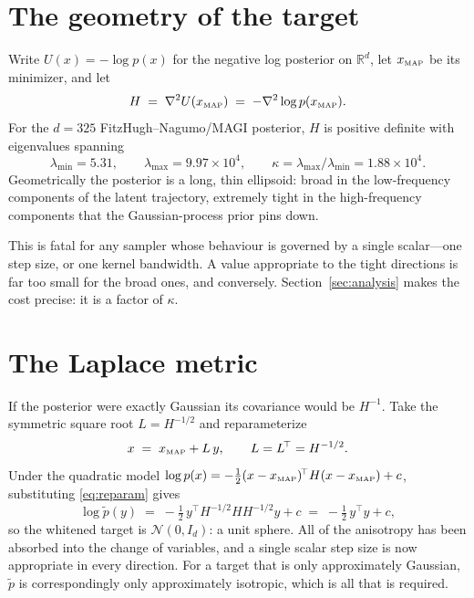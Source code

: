 \documentclass[11pt]{article}
\newcommand{\R}{\mathbb{R}}
\newcommand{\xmap}{x_{\text{\tiny MAP}}}
\begin{document}
\section{The geometry of the target}

Write $U(x) = -\log p(x)$ for the negative log posterior on $\R^d$, let $\xmap$ be its minimizer,
and let
\begin{equation}
  H \;=\; \nabla^2 U(\xmap) \;=\; -\nabla^2 \log p(\xmap).
\end{equation}
For the $d=325$ FitzHugh--Nagumo/MAGI posterior, $H$ is positive definite with eigenvalues
spanning
\[
  \lambda_{\min} = 5.31, \qquad \lambda_{\max} = 9.97\times10^{4},
  \qquad \kappa = \lambda_{\max}/\lambda_{\min} = 1.88\times 10^{4}.
\]
Geometrically the posterior is a long, thin ellipsoid: broad in the low-frequency components of
the latent trajectory, extremely tight in the high-frequency components that the Gaussian-process
prior pins down.

This is fatal for any sampler whose behaviour is governed by a single scalar---one step size, or
one kernel bandwidth. A value appropriate to the tight directions is far too small for the broad
ones, and conversely. Section~\ref{sec:analysis} makes the cost precise: it is a factor of
$\kappa$.

\section{The Laplace metric}

If the posterior were exactly Gaussian its covariance would be $H^{-1}$. Take the symmetric
square root $L = H^{-1/2}$ and reparameterize
\begin{equation}
  x \;=\; \xmap + L\,y, \qquad L = L^{\!\top} = H^{-1/2}.
  \label{eq:reparam}
\end{equation}
Under the quadratic model $\log p(x) = -\tfrac12 (x-\xmap)^{\!\top} H (x-\xmap) + c$, substituting
\eqref{eq:reparam} gives
\begin{equation}
  \log \tilde p(y) \;=\; -\tfrac12\, y^{\!\top} H^{-1/2} H H^{-1/2} y + c
  \;=\; -\tfrac12\, y^{\!\top} y + c,
\end{equation}
so the whitened target is $\mathcal{N}(0, I_d)$: a unit sphere. All of the anisotropy has been
absorbed into the change of variables, and a single scalar step size is now appropriate in every
direction. For a target that is only approximately Gaussian, $\tilde p$ is correspondingly only
approximately isotropic, which is all that is required.
\end{document}
